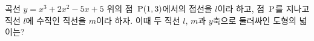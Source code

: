 곡선 $y=x^3+2x^2-5x+5$ 위의 점~$\mathrm{P}(1{,}\mkern3mu\mathopen{}3)$에서의 접선을 $l$이라 하고, 점~$\mathrm{P}$를 지나고 직선 $l$에 수직인 직선을 $m$이라 하자. 이때 두 직선 $l$, $m$과 $y$축으로 둘러싸인 도형의 넓이는?
